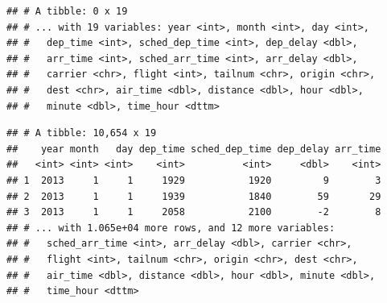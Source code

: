 \documentclass[]{book}
\newenvironment{Shaded}{}{}
\newcommand{\DecValTok}[1]{#1}
\newcommand{\KeywordTok}[1]{\textcolor[rgb]{0.00,0.00,1.00}{#1}}
\newcommand{\NormalTok}[1]{#1}
\newcommand{\OperatorTok}[1]{#1}
\newcommand{\StringTok}[1]{\textcolor[rgb]{0.00,0.50,0.50}{#1}}
\begin{document}
\begin{Shaded}
\end{Shaded}

\begin{verbatim}
## # A tibble: 0 x 19
## # ... with 19 variables: year <int>, month <int>, day <int>,
## #   dep_time <int>, sched_dep_time <int>, dep_delay <dbl>,
## #   arr_time <int>, sched_arr_time <int>, arr_delay <dbl>,
## #   carrier <chr>, flight <int>, tailnum <chr>, origin <chr>,
## #   dest <chr>, air_time <dbl>, distance <dbl>, hour <dbl>,
## #   minute <dbl>, time_hour <dttm>
\end{verbatim}

\begin{Shaded}
\end{Shaded}

\begin{verbatim}
## # A tibble: 10,654 x 19
##    year month   day dep_time sched_dep_time dep_delay arr_time
##   <int> <int> <int>    <int>          <int>     <dbl>    <int>
## 1  2013     1     1     1929           1920         9        3
## 2  2013     1     1     1939           1840        59       29
## 3  2013     1     1     2058           2100        -2        8
## # ... with 1.065e+04 more rows, and 12 more variables:
## #   sched_arr_time <int>, arr_delay <dbl>, carrier <chr>,
## #   flight <int>, tailnum <chr>, origin <chr>, dest <chr>,
## #   air_time <dbl>, distance <dbl>, hour <dbl>, minute <dbl>,
## #   time_hour <dttm>
\end{verbatim}

\begin{Shaded}
\end{Shaded}
\end{document}
